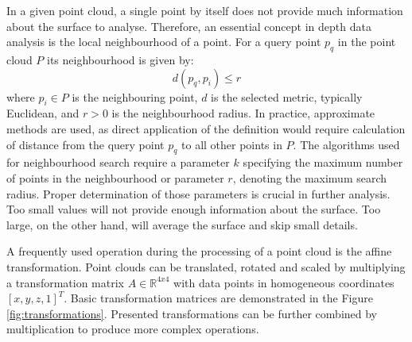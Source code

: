 In a given point cloud, a single point by itself does not provide much information about the surface to analyse. Therefore, an essential concept in depth data analysis is the local neighbourhood of a point. For a query point $p_q$ in the point cloud $P$ its neighbourhood is given by:
\begin{equation}
d(p_	q, p_i) \leq r
\end{equation}
where $p_i \in P$ is the neighbouring point, $d$ is the selected metric, typically Euclidean, and $r>0$ is the neighbourhood radius. In practice, approximate methods are used, as direct application of the definition would require calculation of distance from the query point $p_q$ to all other points in $P$. The algorithms used for neighbourhood search require a parameter $k$ specifying the maximum number of points in the neighbourhood or parameter $r$, denoting the maximum search radius. Proper determination of those parameters is crucial in further analysis. Too small values will not provide enough information about the surface. Too large, on the other hand, will average the surface and skip small details.

A frequently used operation during the processing of a point cloud is the affine transformation. Point clouds can be translated, rotated and scaled by multiplying a transformation matrix $A \in \mathbb{R}^{4x4}$ with data points in homogeneous coordinates $[x,y,z,1]^T$. Basic transformation matrices are demonstrated in the Figure \ref{fig:transformations}. Presented transformations can be further combined by multiplication to produce more complex operations.

